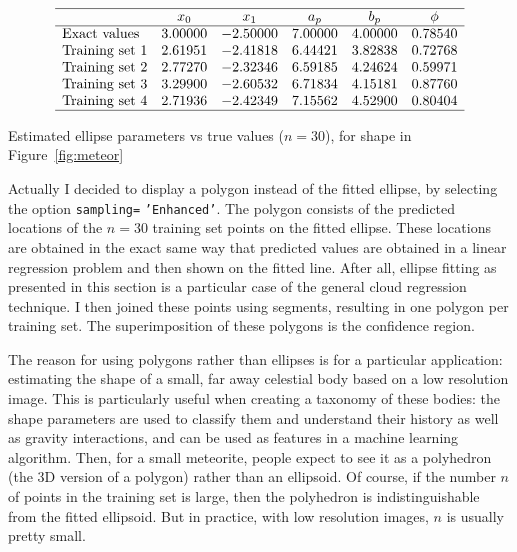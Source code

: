 \documentclass[oneside,10pt]{book}
\renewcommand{\arraystretch}{1.4} %
\begin{document}
\renewcommand{\arraystretch}{1.2} %
\begin{table}[H]
\[
\begin{array}{lccccc}
\hline
   & x_0 & x_1  & a_p & b_p & \phi  \\
\hline
\text{Exact values} & 3.00000 & -2.50000 & 7.00000 & 4.00000 & 0.78540\\
\text{Training set } 1 & 2.61951 & -2.41818 & 6.44421 & 3.82838 & 0.72768 \\
\text{Training set } 2 & 2.77270 & -2.32346 & 6.59185 & 4.24624 & 0.59971 \\
\text{Training set } 3 & 3.29900 & -2.60532 & 6.71834 & 4.15181 & 0.87760 \\
\text{Training set } 4 & 2.71936 & -2.42349 & 7.15562 & 4.52900 & 0.80404 \\
\hline
\end{array}
\]
\caption{\label{ellipar} Estimated ellipse parameters vs true values ($n=30$), for shape in Figure~\ref{fig:meteor}}
\end{table}
\renewcommand{\arraystretch}{1.0} %

Actually I decided to display a polygon instead of the fitted ellipse, by selecting the option \texttt{sampling=} \texttt{'Enhanced'}. The polygon consists of the predicted locations of the $n=30$ training set points on the fitted ellipse. These locations are obtained in the exact same way that predicted values are obtained in a linear regression problem and then shown on the fitted line. After all, ellipse fitting as presented in this section is a particular case of the general cloud regression technique. I then joined these points using segments, resulting in one polygon per training set. The superimposition of these polygons is the confidence region.

The reason for using polygons rather than ellipses is for a particular application: estimating the shape of a small, far away celestial body based on a low resolution image.  This is particularly useful when creating a taxonomy of these bodies: the shape parameters are used to classify them and understand their history as well as gravity interactions, and can be used as features
 in a machine learning algorithm. Then, for a small meteorite, people expect to see it as a polyhedron (the 3D version of a polygon) rather than an ellipsoid. Of course, if the number $n$ of points in the training set is large, then the polyhedron is indistinguishable  from the fitted ellipsoid. But in practice, with low resolution images,  $n$ is usually pretty small.
\end{document}
